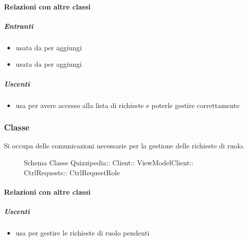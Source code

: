 \paragraph{Relazioni con altre classi}
\subparagraph{Entranti}
\begin{itemize}
\item usata da  per aggiungi
\item usata da  per aggiungi
\end{itemize}
\subparagraph{Uscenti}
\begin{itemize}
\item usa  per avere accesso alla lista di richieste e poterle gestire correttamente
\end{itemize}
\subsubsection{Classe }
Si occupa delle comunicazioni necessarie per la gestione delle richieste di ruolo.
\begin{figure}[H]
\centering
\noindent{}
\caption[Schema Classe CtrlRequestRole]{Schema Classe Quizzipedia:: Client:: ViewModelClient:: CtrlRequests:: CtrlRequestRole}
\end{figure}
\paragraph{Relazioni con altre classi}
\subparagraph{Uscenti}
\begin{itemize}
\item usa  per gestire le richieste di ruolo pendenti
\end{itemize}
